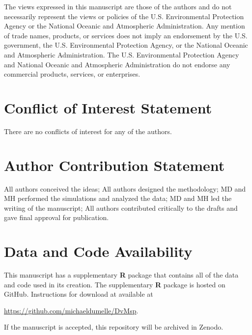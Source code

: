 \documentclass[]{elsarticle} %
\begin{document}
The views expressed in this manuscript are those of the authors and do
not necessarily represent the views or policies of the U.S.
Environmental Protection Agency or the National Oceanic and Atmospheric
Administration. Any mention of trade names, products, or services does
not imply an endorsement by the U.S. government, the U.S. Environmental
Protection Agency, or the National Oceanic and Atmospheric
Administration. The U.S. Environmental Protection Agency and National
Oceanic and Atmospheric Administration do not endorse any commercial
products, services, or enterprises.

\hypertarget{conflict-of-interest-statement}{%
\section*{Conflict of Interest
Statement}\label{conflict-of-interest-statement}}

There are no conflicts of interest for any of the authors.

\hypertarget{author-contribution-statement}{%
\section*{Author Contribution
Statement}\label{author-contribution-statement}}

All authors conceived the ideas; All authors designed the methodology;
MD and MH performed the simulations and analyzed the data; MD and MH led
the writing of the manuscript; All authors contributed critically to the
drafts and gave final approval for publication.

\hypertarget{data-and-code-availability}{%
\section*{Data and Code Availability}\label{data-and-code-availability}}

This manuscript has a supplementary \textbf{\textsf{R}} package that
contains all of the data and code used in its creation. The
supplementary \textbf{\textsf{R}} package is hosted on GitHub.
Instructions for download at available at

\url{https://github.com/michaeldumelle/DvMsp}.

If the manuscript is accepted, this repository will be archived in
Zenodo.
\end{document}
